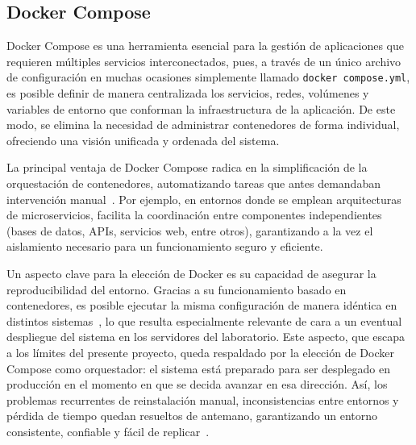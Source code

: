\subsection{Docker Compose}

Docker Compose es una herramienta esencial para la gestión de aplicaciones que requieren múltiples servicios interconectados, pues, a través de un único archivo de configuración en muchas ocasiones simplemente llamado \texttt{docker compose.yml}, es posible definir de manera centralizada los servicios, redes, volúmenes y variables de entorno que conforman la infraestructura de la aplicación. De este modo, se elimina la necesidad de administrar contenedores de forma individual, ofreciendo una visión unificada y ordenada del sistema.~\cite{aidomotics_docker}~\cite{keepcoding_docker}

La principal ventaja de Docker Compose radica en la simplificación de la orquestación de contenedores, automatizando tareas que antes demandaban intervención manual~\cite{hostinger_docker}. Por ejemplo, en entornos donde se emplean arquitecturas de microservicios, facilita la coordinación entre componentes independientes (bases de datos, APIs, servicios web, entre otros), garantizando a la vez el aislamiento necesario para un funcionamiento seguro y eficiente.~\cite{editverse_docker}

Un aspecto clave para la elección de Docker es su capacidad de asegurar la reproducibilidad del entorno. Gracias a su funcionamiento basado en contenedores, es posible ejecutar la misma configuración de manera idéntica en distintos sistemas~\cite{microsoft_microservices_orchestration}, lo que resulta especialmente relevante de cara a un eventual despliegue del sistema en los servidores del laboratorio. Este aspecto, que escapa a los límites del presente proyecto, queda respaldado por la elección de Docker Compose como orquestador: el sistema está preparado para ser desplegado en producción en el momento en que se decida avanzar en esa dirección. Así, los problemas recurrentes de reinstalación manual, inconsistencias entre entornos y pérdida de tiempo quedan resueltos de antemano, garantizando un entorno consistente, confiable y fácil de replicar~\cite{tildavps_docker}.